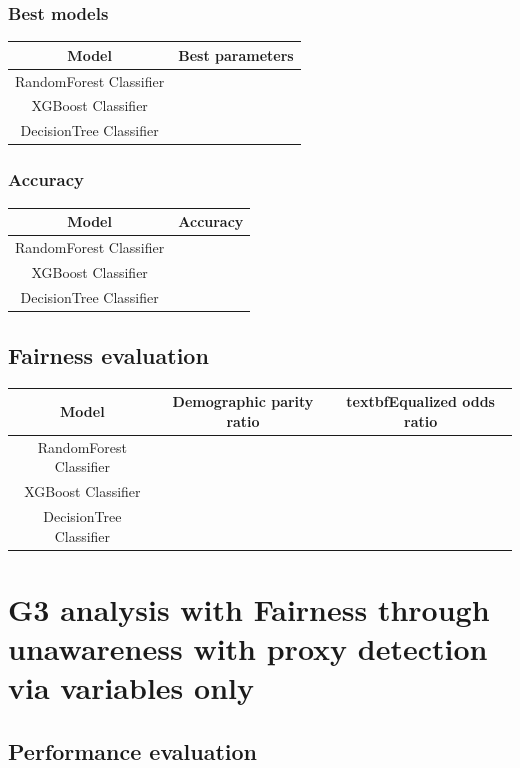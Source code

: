\subsubsection{Best models}

\begin{tabular}{|c|c|}
    \hline
    \textbf{Model} & \textbf{Best parameters} \\
    \hline
    RandomForest Classifier  &  \\
    \hline
    XGBoost Classifier & \\
    \hline
    DecisionTree Classifier & \\
    \hline
\end{tabular}

\subsubsection{Accuracy}

\begin{tabular}{|c|c|}
    \hline
    \textbf{Model} & \textbf{Accuracy} \\ 
    \hline
    RandomForest Classifier  &  \\
    \hline
    XGBoost Classifier & \\
    \hline
    DecisionTree Classifier & \\ 
    \hline
\end{tabular}

\subsection{Fairness evaluation}

\begin{tabular}{|c|c|c|}
    \hline
    \textbf{Model} & \textbf{Demographic parity ratio} & textbf{Equalized odds ratio} \\
    \hline
    RandomForest Classifier & & \\
    \hline
    XGBoost Classifier & & \\
    \hline
    DecisionTree Classifier & & \\
    \hline
\end{tabular}


\section{G3 analysis with Fairness through unawareness with proxy detection via variables only}

\subsection{Performance evaluation}

